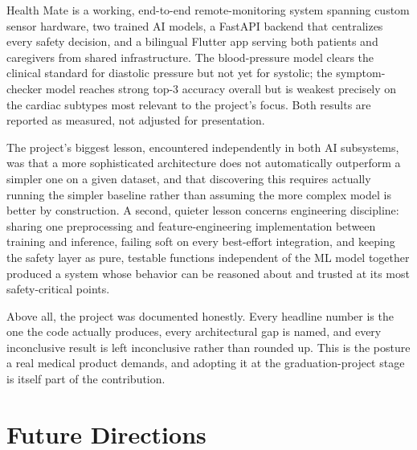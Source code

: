 \documentclass[12pt,a4paper]{report}
\begin{document}
Health Mate is a working, end-to-end remote-monitoring system spanning custom
sensor hardware, two trained AI models, a FastAPI backend that centralizes every
safety decision, and a bilingual Flutter app serving both patients and
caregivers from shared infrastructure. The blood-pressure model clears the
clinical standard for diastolic pressure but not yet for systolic; the
symptom-checker model reaches strong top-3 accuracy overall but is weakest
precisely on the cardiac subtypes most relevant to the project's focus. Both
results are reported as measured, not adjusted for presentation.

The project's biggest lesson, encountered independently in both AI subsystems,
was that a more sophisticated architecture does not automatically outperform a
simpler one on a given dataset, and that discovering this requires actually
running the simpler baseline rather than assuming the more complex model is
better by construction. A second, quieter lesson concerns engineering
discipline: sharing one preprocessing and feature-engineering implementation
between training and inference, failing soft on every best-effort integration,
and keeping the safety layer as pure, testable functions independent of the ML
model together produced a system whose behavior can be reasoned about and
trusted at its most safety-critical points.

Above all, the project was documented honestly. Every headline number is the one
the code actually produces, every architectural gap is named, and every
inconclusive result is left inconclusive rather than rounded up. This is the
posture a real medical product demands, and adopting it at the graduation-project
stage is itself part of the contribution.

\chapter{Future Directions}
\end{document}
